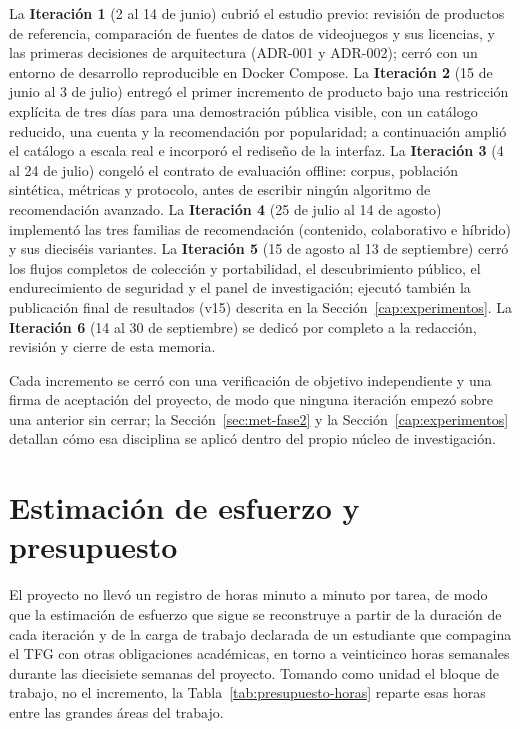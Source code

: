 La \textbf{Iteración 1} (2 al 14 de junio) cubrió el estudio previo: revisión de productos de
referencia, comparación de fuentes de datos de videojuegos y sus licencias, y las primeras
decisiones de arquitectura (ADR-001 y ADR-002); cerró con un entorno de desarrollo
reproducible en Docker Compose. La \textbf{Iteración 2} (15 de junio al 3 de julio) entregó el
primer incremento de producto bajo una restricción explícita de tres días para una
demostración pública visible, con un catálogo reducido, una cuenta y la recomendación por
popularidad; a continuación amplió el catálogo a escala real e incorporó el rediseño de la
interfaz. La \textbf{Iteración 3} (4 al 24 de julio) congeló el contrato de evaluación offline:
corpus, población sintética, métricas y protocolo, antes de escribir ningún algoritmo de
recomendación avanzado. La \textbf{Iteración 4} (25 de julio al 14 de agosto) implementó las
tres familias de recomendación (contenido, colaborativo e híbrido) y sus dieciséis variantes.
La \textbf{Iteración 5} (15 de agosto al 13 de septiembre) cerró los flujos completos de
colección y portabilidad, el descubrimiento público, el endurecimiento de seguridad y el panel
de investigación; ejecutó también la publicación final de resultados (v15) descrita en la
Sección~\ref{cap:experimentos}. La \textbf{Iteración 6} (14 al 30 de septiembre) se dedicó por
completo a la redacción, revisión y cierre de esta memoria.

Cada incremento se cerró con una verificación de objetivo independiente y una firma de
aceptación del proyecto, de modo que ninguna iteración empezó sobre una anterior sin cerrar; la
Sección~\ref{sec:met-fase2} y la Sección~\ref{cap:experimentos} detallan cómo esa disciplina
se aplicó dentro del propio núcleo de investigación.

\section{Estimación de esfuerzo y presupuesto}\label{sec:met-presupuesto}

El proyecto no llevó un registro de horas minuto a minuto por tarea, de modo que la estimación
de esfuerzo que sigue se reconstruye a partir de la duración de cada iteración y de la carga de
trabajo declarada de un estudiante que compagina el TFG con otras obligaciones académicas,
en torno a veinticinco horas semanales durante las diecisiete semanas del proyecto. Tomando
como unidad el bloque de trabajo, no el incremento, la Tabla~\ref{tab:presupuesto-horas}
reparte esas horas entre las grandes áreas del trabajo.

